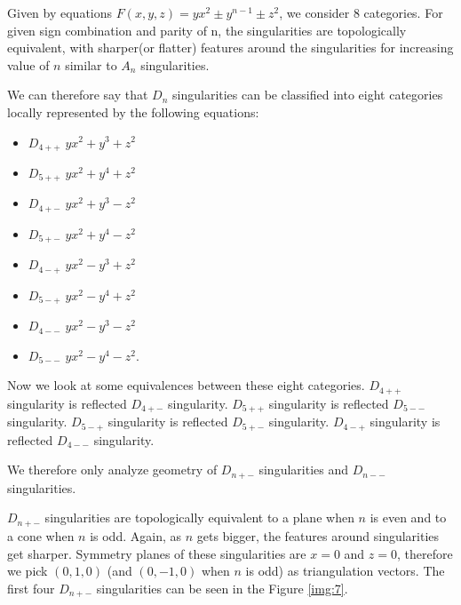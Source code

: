 Given by equations $F(x,y,z)=yx^2\pm y^{n-1}\pm z^2$, we consider 8 categories.
For given sign combination and parity of n, the singularities are topologically
equivalent, with sharper(or flatter) features around the singularities for increasing
value of $n$ similar to $A_n$ singularities.

We can therefore say that $D_n$ singularities can be classified into eight categories
locally represented by the following equations:
\begin{itemize}
    \item $D_{4++}$ \hspace{5mm} $yx^2 + y^3 + z^2$
    \item $D_{5++}$ \hspace{5mm} $yx^2 + y^4 + z^2$
    \item $D_{4+-}$ \hspace{5mm} $yx^2 + y^3 - z^2$
    \item $D_{5+-}$ \hspace{5mm} $yx^2 + y^4 - z^2$
    \item $D_{4-+}$ \hspace{5mm} $yx^2 - y^3 + z^2$
    \item $D_{5-+}$ \hspace{5mm} $yx^2 - y^4 + z^2$
    \item $D_{4--}$ \hspace{5mm} $yx^2 - y^3 - z^2$
    \item $D_{5--}$ \hspace{5mm} $yx^2 - y^4 - z^2$.
\end{itemize}

Now we look at some equivalences between these eight categories.
$D_{4++}$ singularity is reflected $D_{4+-}$ singularity.
$D_{5++}$ singularity is reflected $D_{5--}$ singularity.
$D_{5-+}$ singularity is reflected $D_{5+-}$ singularity.
$D_{4-+}$ singularity is reflected $D_{4--}$ singularity.

We therefore only analyze geometry of $D_{n+-}$ singularities and
$D_{n--}$ singularities.

$D_{n+-}$ singularities are topologically equivalent to a plane when $n$ is
even and to a cone when $n$ is odd. Again, as $n$ gets bigger, the features
around singularities get sharper. Symmetry planes of these singularities
are $x=0$ and $z=0$, therefore we pick $(0, 1, 0)$ (and $(0, -1, 0)$ when $n$ is odd)
as triangulation vectors. The first four $D_{n+-}$ singularities can be seen in
the Figure \ref{img:7}.

